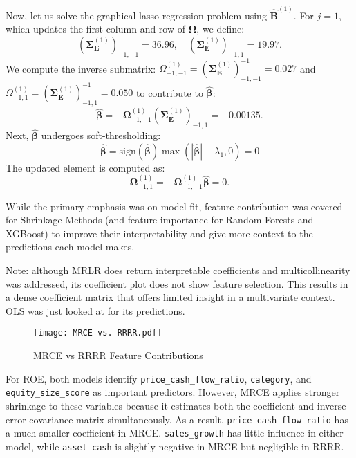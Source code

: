 Now, let us solve the graphical lasso regression problem using \(\mathbf{\hat{B}}^{(1)}\).
For \( j = 1 \), which updates the first column and row of \( \mathbf{\Omega} \), we define: 
\[
(\mathbf{\Sigma}^{(1)}_{\mathbf{E}})_{-1,-1} = 36.96, \quad 
(\mathbf{\Sigma}^{(1)}_{\mathbf{E}})_{-1,1} = 19.97.
\]
We compute the inverse submatrix: $
{\Omega}^{(1)}_{-1,-1}=(\mathbf{\Sigma}^{(1)}_{\mathbf{E}})_{-1,-1}^{-1}=0.027$ and ${\Omega}^{(1)}_{-1,1}=(\mathbf{\Sigma}^{(1)}_{\mathbf{E}})_{-1,1}^{-1}=0.050$ to contribute to $\boldsymbol{\hat{\beta}}$:
\[
\boldsymbol{\hat{\beta}}= -\mathbf{\Omega}^{(1)}_{-1,-1} (\mathbf{\Sigma}^{(1)}_{\mathbf{E}})_{-1,1}=-0.00135.
\]
Next, \( \boldsymbol{\hat{\beta}} \) undergoes soft-thresholding:
\[
\boldsymbol{\hat{\beta}} = \text{sign}(\boldsymbol{\hat{\beta}}) \max( |\boldsymbol{\hat{\beta}}| - \lambda_1, 0)=0
\]
The updated element is computed as:
\[
\mathbf{\Omega}^{(1)}_{-1,1} = -\mathbf{\Omega}^{(1)}_{-1,-1} \hat{\boldsymbol{\beta}}=0.
\]


While the primary emphasis was on model fit, feature contribution was covered for Shrinkage Methods (and feature importance for Random Forests and XGBoost) to improve their interpretability and give more context to the predictions each model makes.

\noindent Note: although MRLR does return interpretable coefficients and multicollinearity was addressed, its coefficient plot does not show feature selection. This results in a dense coefficient matrix that offers limited insight in a multivariate context. OLS was just looked at for its predictions.

\begin{figure}[H]
    \centering
    \texttt{[image: MRCE vs. RRRR.pdf]}
    \caption{MRCE vs RRRR Feature Contributions}
    \label{fig:MRCE vs RRRR}
\end{figure}

\noindent For ROE, both models identify \texttt{price\_cash\_flow\_ratio}, \texttt{category}, and \texttt{equity\_size\_score} as important predictors. However, MRCE applies stronger shrinkage to these variables because it estimates both the coefficient and inverse error covariance matrix simultaneously. As a result, \texttt{price\_cash\_flow\_ratio} has a much smaller coefficient in MRCE. \texttt{sales\_growth} has little influence in either model, while \texttt{asset\_cash} is slightly negative in MRCE but negligible in RRRR.

